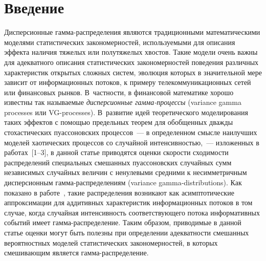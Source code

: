       \begin{multicols}{2}

            \label{st\stat}

\section{Введение}

Дисперсионные гамма-распределения являются традиционными
математическими моделями статистических закономерностей,
используемыми для описания эффекта наличия тяжелых или полутяжелых
хвостов. Такие модели очень важны для адекватного описания
статистических закономерностей поведения различных характеристик
открытых сложных систем, эволюция которых в значительной мере
зависит от информационных потоков, к примеру телекоммуникационных
сетей или финансовых рынков. В~частности, в финансовой математике
хорошо известны так называемые {\it дис\-пер\-си\-он\-ные гам\-ма-про\-цес\-сы}
(variance gamma processes или VG-processes). В~развитие идей
теоретического моделирования таких эффектов с помощью предельных
теорем для обобщенных дважды стохастических пуассоновских процессов~--- 
в определенном смысле наилучших моделей хаотических процессов со
случайной интенсивностью,~--- изложенных в работах~[1--3], в данной
статье приводятся оценки скорости сходимости распределений
специальных смешанных пуассоновских случайных сумм независимых
случайных величин с ненулевыми средними к несимметричным
дисперсионным гам\-ма-рас\-пре\-де\-ле\-ни\-ям (variance gamma-distributions).
Как показано в работе~\cite{KorolevSokolov2012}, такие распределения
возникают как асимптотические аппроксимации для аддитивных
характеристик информационных потоков в том случае, когда случайная
интенсивность соответствующего потока информативных событий имеет
гамма-распределение. Таким образом, приводимые в данной статье
оценки могут быть полезны при определении адекватности смешанных
вероятностных моделей статистических закономерностей, в которых
смешивающим является гам\-ма-рас\-пре\-де\-ление.


\end{multicols}
